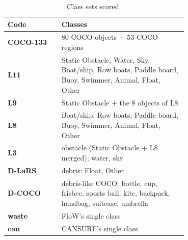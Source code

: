 \begin{table}[t]
\centering
\small
\begin{tabular}{lp{0.7\linewidth}}
\toprule
Code & Classes \\
\midrule
\raisebox{\ht\strutbox}{\hypertarget{cls:COCO-133}{}}\textbf{COCO-133} & 80 COCO objects + 53 COCO regions \\
\raisebox{\ht\strutbox}{\hypertarget{cls:L11}{}}\textbf{L11} & Static Obstacle, Water, Sky, Boat/ship, Row boats, Paddle board, Buoy, Swimmer, Animal, Float, Other \\
\raisebox{\ht\strutbox}{\hypertarget{cls:L9}{}}\textbf{L9} & Static Obstacle + the 8 objects of L8 \\
\raisebox{\ht\strutbox}{\hypertarget{cls:L8}{}}\textbf{L8} & Boat/ship, Row boats, Paddle board, Buoy, Swimmer, Animal, Float, Other \\
\raisebox{\ht\strutbox}{\hypertarget{cls:L3}{}}\textbf{L3} & obstacle (Static Obstacle + L8 merged), water, sky \\
\raisebox{\ht\strutbox}{\hypertarget{cls:D-LaRS}{}}\textbf{D-LaRS} & debris: Float, Other \\
\raisebox{\ht\strutbox}{\hypertarget{cls:D-COCO}{}}\textbf{D-COCO} & debris-like COCO: bottle, cup, frisbee, sports ball, kite, backpack, handbag, suitcase, umbrella \\
\raisebox{\ht\strutbox}{\hypertarget{cls:waste}{}}\textbf{waste} & FloW's single class \\
\raisebox{\ht\strutbox}{\hypertarget{cls:can}{}}\textbf{can} & CANSURF's single class \\
\bottomrule
\end{tabular}
\caption{Class sets scored.}
\label{tab:classsets}
\end{table}

